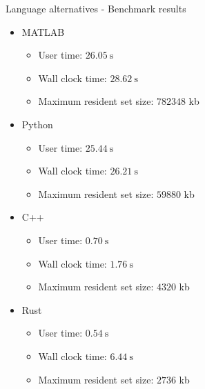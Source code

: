 \documentclass{beamer}
\begin{document}
\begin{frame}{Language alternatives - Benchmark results}

    \begin{itemize}
        \item MATLAB

        \begin{itemize}
            \item User time: $\SI{26.05}{\second}$
            \item Wall clock time: $\SI{28.62}{\second}$
            \item Maximum resident set size: $782348$ kb
        \end{itemize}

        \item Python

        \begin{itemize}
            \item User time: $\SI{25.44}{\second}$
            \item Wall clock time: $\SI{26.21}{\second}$
            \item Maximum resident set size: $59880$ kb
        \end{itemize}

        \item C++
        
        \begin{itemize}
            \item User time: $\SI{0.70}{\second}$
            \item Wall clock time: $\SI{1.76}{\second}$
            \item Maximum resident set size: $4320$ kb
        \end{itemize}

        \item Rust
        
        \begin{itemize}
            \item User time: $\SI{0.54}{\second}$
            \item Wall clock time: $\SI{6.44}{\second}$
            \item Maximum resident set size: $2736$ kb
        \end{itemize}
    \end{itemize}
    
\end{frame}
\end{document}
